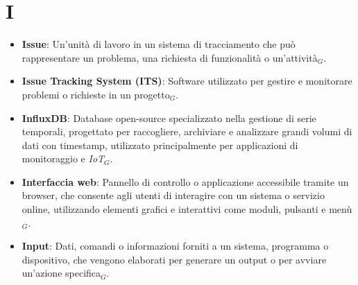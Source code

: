 \section{I}
\begin{itemize}
    \item \textbf{Issue}: Un'unità di lavoro in un sistema di tracciamento che può rappresentare un problema, una richiesta di funzionalità o un'attività$_G$.
    \item \textbf{Issue Tracking System (ITS)}: Software utilizzato per gestire e monitorare problemi o richieste in un progetto$_G$.
    \item \textbf{InfluxDB}: Database open-source specializzato nella gestione di serie temporali, progettato per raccogliere, archiviare e analizzare grandi volumi di dati con timestamp, utilizzato principalmente per applicazioni di monitoraggio e \textit{IoT}$_G$.
    \item \textbf{Interfaccia web}: Pannello di controllo o applicazione accessibile tramite un browser, che consente agli utenti di interagire con un sistema o servizio online, utilizzando elementi grafici e interattivi come moduli, pulsanti e menù$_G$.
    \item \textbf{Input}: Dati, comandi o informazioni forniti a un sistema, programma o dispositivo, che vengono elaborati per generare un output o per avviare un'azione specifica$_G$.
\end{itemize}
